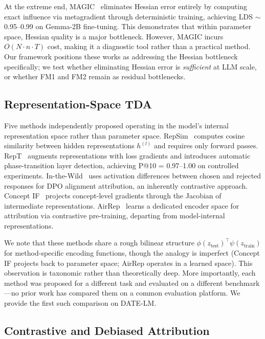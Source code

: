 \documentclass{article}
\begin{document}
At the extreme end, MAGIC~\citep{kothawade2024magic} eliminates Hessian error entirely by computing exact influence via metagradient through deterministic training, achieving LDS $\sim$0.95--0.99 on Gemma-2B fine-tuning. This demonstrates that within parameter space, Hessian quality is a major bottleneck. However, MAGIC incurs $O(N \cdot n \cdot T)$ cost, making it a diagnostic tool rather than a practical method. Our framework positions these works as addressing the Hessian bottleneck specifically; we test whether eliminating Hessian error is \emph{sufficient} at LLM scale, or whether FM1 and FM2 remain as residual bottlenecks.

\subsection{Representation-Space TDA}

Five methods independently proposed operating in the model's internal representation space rather than parameter space. RepSim~\citep{li2024repsim} computes cosine similarity between hidden representations $h^{(l)}$ and requires only forward passes. RepT~\citep{tang2024rept} augments representations with loss gradients and introduces automatic phase-transition layer detection, achieving P@10 = 0.97--1.00 on controlled experiments. In-the-Wild~\citep{wang2024inthewild} uses activation differences between chosen and rejected responses for DPO alignment attribution, an inherently contrastive approach. Concept IF~\citep{choe2024conceptif} projects concept-level gradients through the Jacobian of intermediate representations. AirRep~\citep{sun2025airrep} learns a dedicated encoder space for attribution via contrastive pre-training, departing from model-internal representations.

We note that these methods share a rough bilinear structure $\phi(z_\text{test})^\top \psi(z_\text{train})$ for method-specific encoding functions, though the analogy is imperfect (Concept IF projects back to parameter space; AirRep operates in a learned space). This observation is taxonomic rather than theoretically deep. More importantly, each method was proposed for a different task and evaluated on a different benchmark---no prior work has compared them on a common evaluation platform. We provide the first such comparison on DATE-LM.

\subsection{Contrastive and Debiased Attribution}
\end{document}

